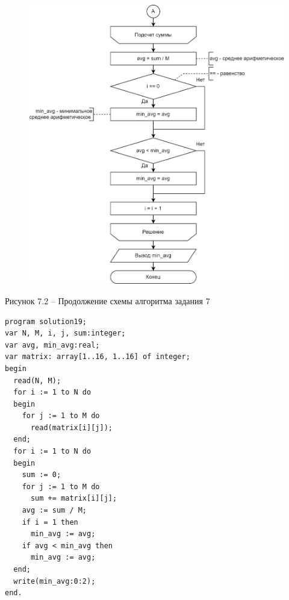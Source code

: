 \documentclass[a4paper,14pt]{extarticle}
\begin{document}
  \pagebreak
  \begin{figure}[h]
    \centering
    \includegraphics[width=0.8\linewidth]{schemes/s-7-2}
  \end{figure}
  \begin{center}
    Рисунок 7.2 – Продолжение схемы алгоритма задания 7
  \end{center}
  \begin{lstlisting}[tabsize=2,basicstyle=\ttfamily]
program solution19;
var N, M, i, j, sum:integer;
var avg, min_avg:real;
var matrix: array[1..16, 1..16] of integer;
begin
  read(N, M);
  for i := 1 to N do
  begin
    for j := 1 to M do
      read(matrix[i][j]);
  end;
  for i := 1 to N do
  begin
    sum := 0;
    for j := 1 to M do
      sum += matrix[i][j];
    avg := sum / M;
    if i = 1 then
      min_avg := avg;
    if avg < min_avg then
      min_avg := avg;
  end;
  write(min_avg:0:2);
end.
  \end{lstlisting}

  \newpage
\end{document}

